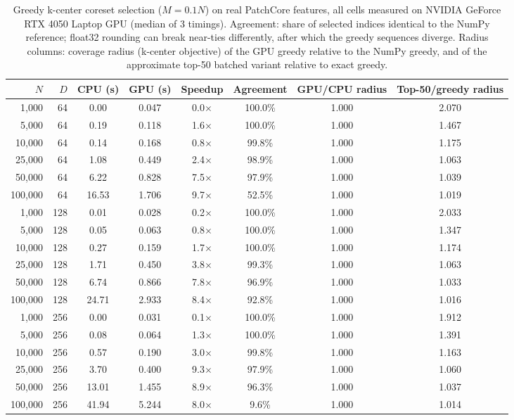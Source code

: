 \begin{table}[tbp]
\centering
\small
\caption{Greedy k-center coreset selection ($M=0.1N$) on real PatchCore features, all cells measured on NVIDIA GeForce RTX 4050 Laptop GPU (median of 3 timings). Agreement: share of selected indices identical to the NumPy reference; float32 rounding can break near-ties differently, after which the greedy sequences diverge. Radius columns: coverage radius (k-center objective) of the GPU greedy relative to the NumPy greedy, and of the approximate top-50 batched variant relative to exact greedy.}
\label{tab:coreset}
\begin{adjustbox}{max width=\linewidth}
\begin{tabular}{rrcccccc}
\toprule
\textbf{$N$} & \textbf{$D$} & \textbf{CPU (s)} & \textbf{GPU (s)} & \textbf{Speedup} & \textbf{Agreement} & \textbf{GPU/CPU radius} & \textbf{Top-50/greedy radius} \\
\midrule
1,000 & 64 & 0.00 & 0.047 & 0.0$\times$ & 100.0\% & 1.000 & 2.070 \\
5,000 & 64 & 0.19 & 0.118 & 1.6$\times$ & 100.0\% & 1.000 & 1.467 \\
10,000 & 64 & 0.14 & 0.168 & 0.8$\times$ & 99.8\% & 1.000 & 1.175 \\
25,000 & 64 & 1.08 & 0.449 & 2.4$\times$ & 98.9\% & 1.000 & 1.063 \\
50,000 & 64 & 6.22 & 0.828 & 7.5$\times$ & 97.9\% & 1.000 & 1.039 \\
100,000 & 64 & 16.53 & 1.706 & 9.7$\times$ & 52.5\% & 1.000 & 1.019 \\
1,000 & 128 & 0.01 & 0.028 & 0.2$\times$ & 100.0\% & 1.000 & 2.033 \\
5,000 & 128 & 0.05 & 0.063 & 0.8$\times$ & 100.0\% & 1.000 & 1.347 \\
10,000 & 128 & 0.27 & 0.159 & 1.7$\times$ & 100.0\% & 1.000 & 1.174 \\
25,000 & 128 & 1.71 & 0.450 & 3.8$\times$ & 99.3\% & 1.000 & 1.063 \\
50,000 & 128 & 6.74 & 0.866 & 7.8$\times$ & 96.9\% & 1.000 & 1.033 \\
100,000 & 128 & 24.71 & 2.933 & 8.4$\times$ & 92.8\% & 1.000 & 1.016 \\
1,000 & 256 & 0.00 & 0.031 & 0.1$\times$ & 100.0\% & 1.000 & 1.912 \\
5,000 & 256 & 0.08 & 0.064 & 1.3$\times$ & 100.0\% & 1.000 & 1.391 \\
10,000 & 256 & 0.57 & 0.190 & 3.0$\times$ & 99.8\% & 1.000 & 1.163 \\
25,000 & 256 & 3.70 & 0.400 & 9.3$\times$ & 97.9\% & 1.000 & 1.060 \\
50,000 & 256 & 13.01 & 1.455 & 8.9$\times$ & 96.3\% & 1.000 & 1.037 \\
100,000 & 256 & 41.94 & 5.244 & 8.0$\times$ & 9.6\% & 1.000 & 1.014 \\
\bottomrule
\end{tabular}
\end{adjustbox}
\end{table}
